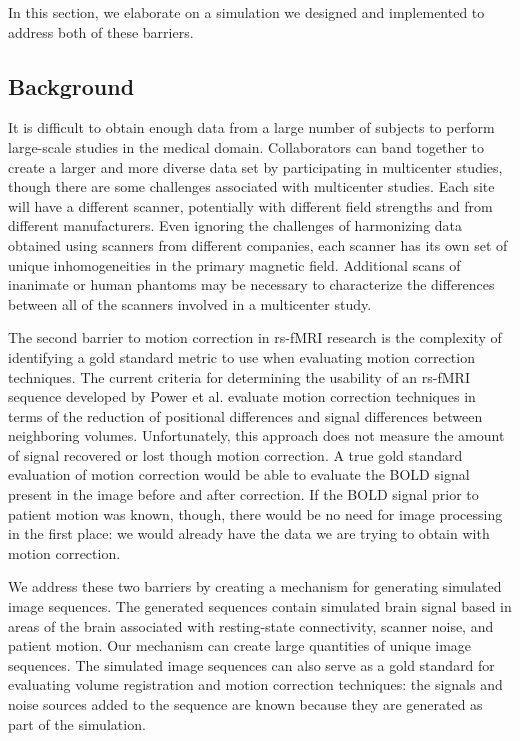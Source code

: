 In this section, we elaborate on a simulation we designed and implemented to address both of these barriers.

\subsection{Background}

It is difficult to obtain enough data from a large number of subjects to perform large-scale studies in the medical domain. Collaborators can band together to create a larger and more diverse data set by participating in multicenter studies, though there are some challenges associated with multicenter studies. Each site will have a different scanner, potentially with different field strengths and from different manufacturers. Even ignoring the challenges of harmonizing data obtained using scanners from different companies, each scanner has its own set of unique inhomogeneities in the primary magnetic field. Additional scans of inanimate or human phantoms may be necessary to characterize the differences between all of the scanners involved in a multicenter study.

The second barrier to motion correction in rs-fMRI research is the complexity of identifying a gold standard metric to use when evaluating motion correction techniques. The current criteria for determining the usability of an rs-fMRI sequence developed by Power et al. evaluate motion correction techniques in terms of the reduction of positional differences and signal differences between neighboring volumes. Unfortunately, this approach does not measure the amount of signal recovered or lost though motion correction. A true gold standard evaluation of motion correction would be able to evaluate the BOLD signal present in the image before and after correction. If the BOLD signal prior to patient motion was known, though, there would be no need for image processing in the first place: we would already have the data we are trying to obtain with motion correction.

We address these two barriers by creating a mechanism for generating simulated image sequences. The generated sequences contain simulated brain signal based in areas of the brain associated with resting-state connectivity, scanner noise, and patient motion. Our mechanism can create large quantities of unique image sequences. The simulated image sequences can also serve as a gold standard for evaluating volume registration and motion correction techniques: the signals and noise sources added to the sequence are known because they are generated as part of the simulation.

